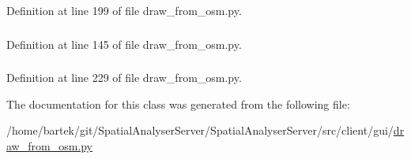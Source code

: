 Definition at line 199 of file draw\_\-from\_\-osm.py.

\hypertarget{classsrc_1_1client_1_1gui_1_1draw__from__osm_1_1Ui__DrawFromOSMFile_a87e2ae629fc41791b3339ddcacaaa865}{
\subsubsection[{rows}]{}}
\label{classsrc_1_1client_1_1gui_1_1draw__from__osm_1_1Ui__DrawFromOSMFile_a87e2ae629fc41791b3339ddcacaaa865}


Definition at line 145 of file draw\_\-from\_\-osm.py.

\hypertarget{classsrc_1_1client_1_1gui_1_1draw__from__osm_1_1Ui__DrawFromOSMFile_aadcf45718a5155e20e20a4afc26fcaff}{
\subsubsection[{sh}]{}}
\label{classsrc_1_1client_1_1gui_1_1draw__from__osm_1_1Ui__DrawFromOSMFile_aadcf45718a5155e20e20a4afc26fcaff}


Definition at line 229 of file draw\_\-from\_\-osm.py.



The documentation for this class was generated from the following file:\begin{DoxyCompactItemize}
\item 
/home/bartek/git/SpatialAnalyserServer/SpatialAnalyserServer/src/client/gui/\hyperlink{draw__from__osm_8py}{draw\_\-from\_\-osm.py}\end{DoxyCompactItemize}
